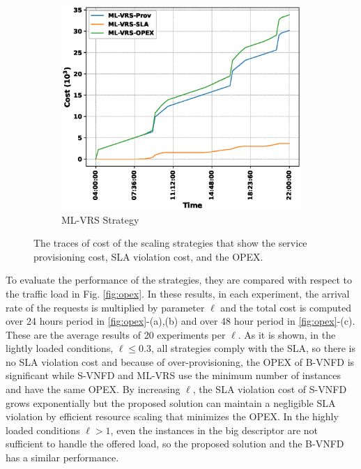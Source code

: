 \documentclass[conference, final]{IEEEtran}
\begin{document}
{\begin{figure}
\hfill
\begin{subfigure}[h]{0.32\linewidth}
\includegraphics[width=\linewidth]{./figures/ML-VRScost_trace.eps}
\caption{{\textsf{ML-VRS}} Strategy}
\end{subfigure}
\caption{The traces of cost of the scaling strategies that show the service provisioning cost, SLA violation cost, and the OPEX.}
\label{fig:cost_trace}
\end{figure}

To evaluate the performance of the strategies, they are compared with respect to the traffic load in Fig. \ref{fig:opex}. In these results, in each experiment, the arrival rate of the requests is multiplied by parameter $\ell$ and the total cost is computed over 24 hours period in \ref{fig:opex}-(a),(b) and over 48 hour period in \ref{fig:opex}-(c). These are the average results of 20 experiments per $\ell$. As it is shown, in the lightly loaded conditions, $\ell \leq 0.3$, all strategies comply with the SLA, so there is no SLA violation cost and because of over-provisioning, the OPEX of {\small \textsf{B-VNFD}} is significant while {\small \textsf{S-VNFD}} and {\small \textsf{ML-VRS}} use the minimum number of instances and have the same OPEX. By increasing $\ell$, the SLA violation cost of {\small \textsf{S-VNFD}} grows exponentially but the proposed solution can maintain a negligible SLA violation by efficient resource scaling that minimizes the OPEX. In the highly loaded conditions $\ell > 1$, even the instances in the big descriptor are not sufficient to handle the offered load, so the proposed solution and the {\small \textsf{B-VNFD}} has a similar performance.

}
\end{document}
